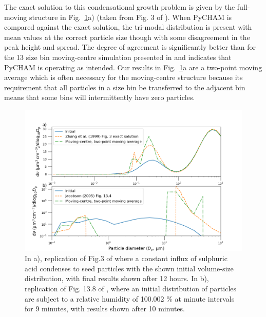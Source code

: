 \documentclass[gmd, manuscript]{copernicus}
\begin{document}
The exact solution to this condensational growth problem is given by the full-moving structure in Fig.~\ref{fig:mov_cen_test}a) (taken from Fig. 3 of \citet{Zhang1999}).  When PyCHAM is compared against the exact solution, the tri-modal distribution is present with mean values at the correct particle size though with some disagreement in the peak height and spread.  The degree of agreement is significantly better than for the 13 size bin moving-centre simulation presented in \citet{Zhang1999} and indicates that PyCHAM is operating as intended.  Our results in Fig.~\ref{fig:mov_cen_test}a are a two-point moving average which is often necessary for the moving-centre structure because its requirement that all particles in a size bin be transferred to the adjacent bin means that some bins will intermittently have zero particles.

\begin{figure}[t]
\includegraphics[width=12.0cm]{Results/mov_cen_test.png}
\caption{In a), replication of Fig.3 of \citet{Zhang1999} where a constant influx of sulphuric acid condenses to seed particles with the shown initial volume-size distribution, with final results shown after 12 hours.  In b), replication of Fig. 13.8 of \citet{Jacobson2005}, where an initial distribution of particles are subject to a relative humidity of 100.002 \% at minute intervals for 9 minutes, with results shown after 10 minutes.}
\label{fig:mov_cen_test}
\end{figure}
\end{document}
